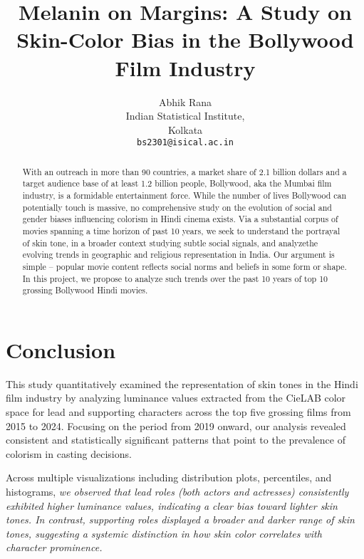 \documentclass{article}
\title{Melanin on Margins: A Study on Skin-Color Bias in the Bollywood Film Industry
}
\author{
  Abhik Rana\\
  Indian Statistical Institute, \\
  Kolkata\\
  \texttt{bs2301@isical.ac.in}
}
\begin{document}
\maketitle


\begin{abstract}
  With an outreach in more than 90 countries, a market share of 2.1 billion dollars and a target audience base of at least 1.2 billion people, Bollywood, aka the Mumbai film industry, is a formidable entertainment force. While the number of lives Bollywood can potentially touch is massive, no comprehensive study on the evolution of social and gender biases influencing colorism in Hindi cinema exists. Via a substantial corpus of movies spanning a time horizon of past 10 years, we seek to
  understand the portrayal of skin tone, in a broader context studying subtle social signals, and analyzethe evolving trends in geographic and religious representation in India. Our argument is simple – popular movie content reflects social norms and beliefs in some form or shape. In this project, we propose to analyze such trends over the past 10 years of top 10 grossing Bollywood Hindi movies.
\end{abstract}
















\section{Conclusion}
\label{sec:conclusion}
This study quantitatively examined the representation of skin tones in the Hindi film industry by analyzing luminance values extracted from the CieLAB color space for lead and supporting characters across the top five grossing films from 2015 to 2024. Focusing on the period from 2019 onward, our analysis revealed consistent and statistically significant patterns that point to the prevalence of colorism in casting decisions.

Across multiple visualizations including distribution plots, percentiles, and histograms, \textit{we observed that lead roles (both actors and actresses) consistently exhibited higher luminance values, indicating a clear bias toward lighter skin tones. In contrast, supporting roles displayed a broader and darker range of skin tones, suggesting a systemic distinction in how skin color correlates with character prominence.}
\end{document}

